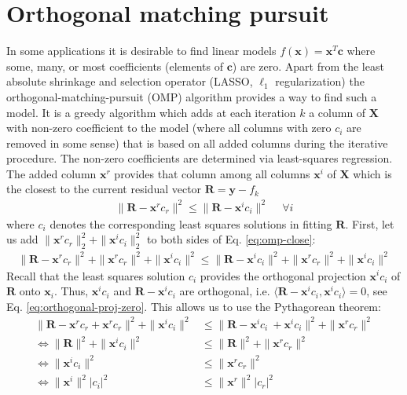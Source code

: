 \documentclass[11pt, a4paper, parskip=half*, bibliography=totoc, cleardoublepage=empty, final,
numbers=noenddot]{scrbook}
\begin{document}
\section{Orthogonal matching pursuit}
In some applications it is desirable to find linear models $f(\bm{x}) = \bm{x}^T \bm{c}$ where some, many, or most coefficients (elements of $\bm{c}$) are zero. Apart from the least absolute shrinkage and selection operator (LASSO, $\ell_1$ regularization) the orthogonal-matching-pursuit (OMP) algorithm provides a way to find such a model. It is a greedy algorithm which adds at each iteration $k$ a column of $\bm{X}$ with non-zero coefficient to the model (where all columns with zero $c_i$ are removed in some sense) that is based on all added columns during the iterative procedure. The non-zero coefficients are determined via least-squares regression. The added column $\bm{x}^r$ provides that column among all columns $\bm{x}^i$ of $\bm{X}$ which is the closest to the current residual vector $\bm{R} = \bm{y} - f_k$
\begin{align}
\|\bm{R} - \bm{x}^r c_r \|^2 \leq \|\bm{R} - \bm{x}^i c_i \|^2 \ \quad \forall i 
\label{eq:omp-close}
\end{align}
where $c_i$ denotes the corresponding least squares solutions in fitting $\bm{R}$. First, let us add $\|\bm{x}^r c_r\|_2^2+ \|\bm{x}^i c_i\|_2^2$ to both sides of Eq. \ref{eq:omp-close}: 
\begin{align}
\|\bm{R} - \bm{x}^r c_r \|^2 + \|\bm{x}^r c_r\|^2+ \|\bm{x}^i c_i\|^2 \leq \|\bm{R} - \bm{x}^i c_i \|^2 + \|\bm{x}^r c_r\|^2+ \|\bm{x}^i c_i\|^2 
\end{align}
Recall that the least squares solution $c_i$ provides the orthogonal projection $\bm{x}^i c_i$ of $\bm{R}$ onto $\bm{x}_i$. Thus, $\bm{x}^i c_i$ and $\bm{R} - \bm{x}^i c_i$ are orthogonal, i.e. $\langle \bm{R} - \bm{x}^i c_i , \bm{x}^i c_i \rangle = 0$, see Eq. \ref{eq:orthogonal-proj-zero}. This allows us to use the Pythagorean theorem:
\begin{align}
\|\bm{R} - \bm{x}^r c_r + \bm{x}^r c_r\|^2+ \|\bm{x}^i c_i\|^2  &\leq \|\bm{R} - \bm{x}^i c_i\ + \bm{x}^i c_i\|^2 + \|\bm{x}^r c_r\|^2 \\
\Leftrightarrow \|\bm{R}\|^2+ \|\bm{x}^i c_i\|^2          &\leq \|\bm{R}\|^2 + \|\bm{x}^r c_r\|^2 \\
\Leftrightarrow \|\bm{x}^i c_i\|^2 &\leq  \|\bm{x}^r c_r\|^2 \\
\Leftrightarrow \| \bm{x}^i\|^2 | c_i|^2  &\leq  \|\bm{x}^r \|^2 | c_r|^2\\
\end{align}
\end{document}
